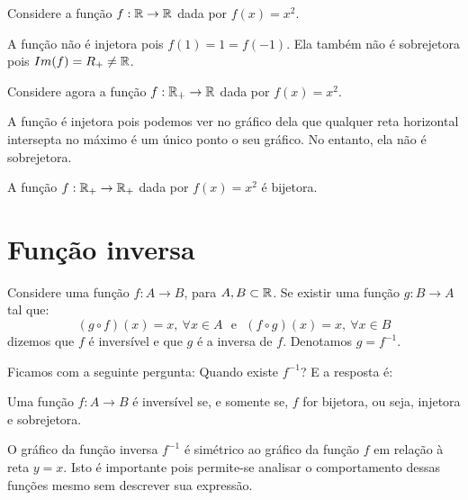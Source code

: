 

\begin{exem}
    Considere a função $f:\mathbb{R}\to \mathbb{R}$ dada por $f(x)=x^2$.

    A função não é injetora pois $f(1)=1=f(-1)$. Ela também não é sobrejetora pois $Im(f)=R_+\neq \mathbb{R}$.
\end{exem}

\begin{exem}
    Considere agora a função $f:\mathbb{R}_+\to \mathbb{R}$ dada por $f(x)=x^2$.

    A função é injetora pois podemos ver no gráfico dela que qualquer reta horizontal intersepta no máximo é um único ponto o seu gráfico. No entanto, ela não é sobrejetora.


\end{exem}

\begin{exem}
    A função $f:\mathbb{R}_+\to \mathbb{R}_+$ dada por $f(x)=x^2$ é bijetora.
\end{exem}

\section{Função inversa}

 Considere uma função $f: A \rightarrow B$, para $A, B \subset \mathbb{R}$. Se existir uma função $g: B \rightarrow A$ tal que:
 \[(g \circ f)(x)= x,\ \forall x \in A \ \ \ \text {e} \ \ \
 (f \circ g)(x)= x,\ \forall x \in B\]
 dizemos que $f$ é inversível e que $g$ é a inversa de $f$. Denotamos $g= f^{-1}$.

 Ficamos com a seguinte pergunta: Quando existe $f^{-1}$? E a resposta é:


\begin{obs}
 Uma função $f: A \to B$ é inversível se, e somente se, $f$ for bijetora, ou seja, injetora e sobrejetora.
\end{obs}

O gráfico da função inversa $f^{-1}$ é simétrico ao gráfico da função $f$ em relação à reta $y = x$. Isto é importante pois permite-se analisar o comportamento dessas funções mesmo sem descrever sua expressão.

